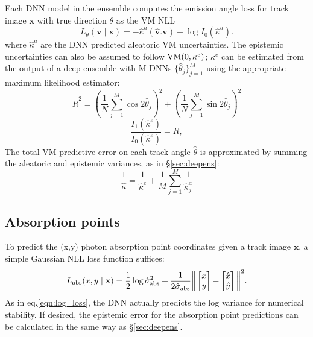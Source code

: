 Each DNN model in the ensemble computes the emission angle loss for track image $\mathbf{x}$ with true direction $\theta$ as the VM NLL 
\begin{equation}
    L_{\theta}(\mathbf{v} \mid \mathbf{x}) = -\hat{\kappa}^a(\hat{\mathbf{v}}.\mathbf{v}) + \log I_0(\hat{\kappa}^a) .
    \label{eqn:loss}
\end{equation}
where $\hat{\kappa}^a$ are the DNN predicted aleatoric VM uncertainties.
The epistemic uncertainties can also be assumed to follow ${\rm VM}(0,\kappa^e)$; $\kappa^e$ can be estimated from the output of a deep ensemble with M DNNs $\{\hat{\theta}_{j}\}^M_{j=1}$ using the appropriate maximum likelihood estimator:
\begin{equation}
    \bar{R}^2 = \left(\frac{1}{N}\sum_{j=1}^M\cos2\hat{\theta}_{j}\right)^2 + \left(\frac{1}{N}\sum_{j=1}^M\sin2\hat{\theta}_{j}\right)^2 
\end{equation}
\begin{equation}
    \label{eqn:epis}
    \frac{I_1(\hat{\kappa}^e)}{I_0(\hat{\kappa}^e) } = \bar{R},    
\end{equation}
The total VM predictive error on each track angle $\hat{\theta}$ is approximated by summing the aleatoric and epistemic variances, as in \S\ref{sec:deepens}: 
\begin{equation}
\frac{1}{\hat{\kappa}} =   \frac{1}{\hat{\kappa}^e} + \frac{1}{M}\sum_{j=1}^M \frac{1}{\hat{\kappa}^a_{j}}
\end{equation}


\subsection{Absorption points} To predict the (x,y) photon absorption point coordinates given a track image $\mathbf{x}$, a simple Gaussian NLL loss function suffices:
\begin{equation}
     \label{eqn:DE_abs_loss}
    L_{\rm abs}(x,y \mid \mathbf{x}) = \frac{1}{2}\log\hat{\sigma}_{\rm abs}^2 + \frac{1}{2\hat{\sigma}_{\rm abs}}\bigg\|
    \begin{bmatrix}
    x \\ y
    \end{bmatrix}
    - \begin{bmatrix}
    \hat{x} \\ \hat{y}
    \end{bmatrix}\bigg\|^2.
\end{equation}
As in eq.\ref{eqn:log_loss}, the DNN actually predicts the log variance for numerical stability. If desired, the epistemic error for the absorption point predictions can be calculated in the same way as \S\ref{sec:deepens}.


